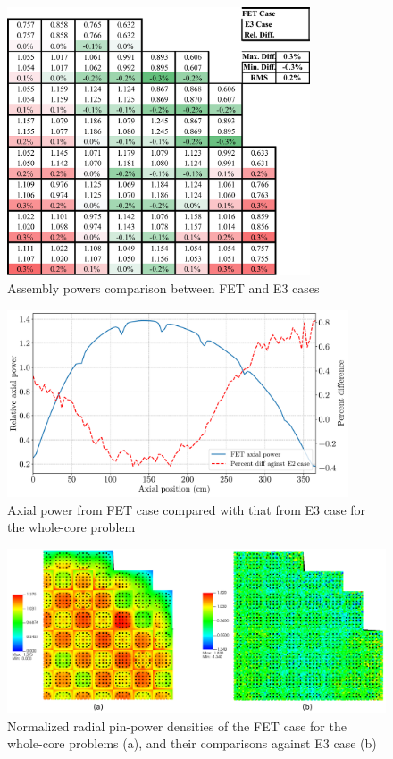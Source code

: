 \begin{figure}
    \centering
    \includegraphics[width=0.8\textwidth]{figs/asm_power.pdf}
    \caption{Assembly powers comparison between FET and E3 cases}
    \label{fig_49}
\end{figure}

\begin{figure}
    \centering
    \includegraphics[width=0.9\textwidth]{figs/axial_pow.pdf}
    \caption[Axial power comparison for the whole-core problem]{Axial power from FET case compared with that from E3 case for the whole-core problem}
    \label{fig_49a}
\end{figure}

\begin{figure}
    \centering
    \includegraphics[width=1.0\textwidth]{figs/core_fet.pdf}
    \caption[Normalized radial pin-power densities of the FET case for the whole-core problems]{Normalized radial pin-power densities of the FET case for the whole-core problems (a), and their comparisons against E3 case (b)}
    \label{fig_48}
\end{figure}


